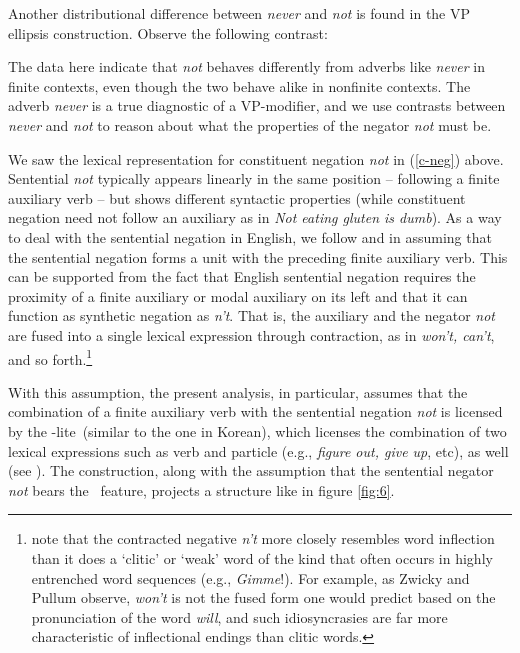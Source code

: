 \documentclass[output=paper]{langsci/langscibook}
\begin{document}
{\begin{exe}
\begin{xlist}
\begin{exe}
\begin{xlist}
Another distributional difference between \emph{never} and \emph{not} is found in
the VP ellipsis construction.  Observe the following
contrast:

\eal
\label{vpe-not-ex}
\zl


%
The data here indicate that \emph{not} behaves differently from
adverbs like \emph{never} in finite contexts, even though the two
behave alike in nonfinite contexts. The adverb \emph{never} is a true
diagnostic of a VP-modifier, and we use contrasts between \emph{never} and \emph{not} to reason about what the properties of
the negator \emph{not} must be.


We saw the lexical representation for constituent negation
\emph{not} in (\ref{c-neg}) above.
 Sentential \emph{not} typically appears linearly in the
same position -- following a finite auxiliary verb -- but shows
different syntactic properties (while
 constituent negation need not follow an auxiliary
 as in \emph{Not eating gluten is dumb}).
 As a way
 to deal with the sentential negation in English,
  we follow \citet{Bresnan:01} and \citet{KM} in assuming that the sentential negation forms a unit with the preceding
finite auxiliary verb.  This can be supported from
the fact that English sentential negation requires the proximity of
a finite auxiliary or modal auxiliary on its left and that it can function as synthetic negation as \emph{n't}. That is, the auxiliary and the negator \emph{not} are fused into a single lexical
expression through contraction, as in \emph{won't, can't},
and so forth.\footnote{\citet{ZP:83} note that the contracted
negative \emph{n't} more closely
resembles word inflection than it does a `clitic' or `weak' word of
the kind that often occurs in highly entrenched word sequences
(e.g., \emph{Gimme}!). For example, as Zwicky and Pullum observe,
\emph{won't} is not the fused form one would predict based on
the pronunciation of the word \emph{will}, and such idiosyncrasies are far more characteristic of inflectional endings than clitic words.}



 With this assumption, the
present analysis, in particular, assumes that
the combination of a finite auxiliary verb with the sentential
negation \emph{not} is licensed by the \hd-lite\ (similar to the one
in Korean), which licenses
the combination of two lexical expressions such as verb and particle (e.g., \emph{figure out, give up}, etc), as well (see \citet{KM}). The construction, along with the assumption that the sentential negator \emph{not}
bears the \LEX\ feature, projects a structure like in figure \ref{fig:6}.


\end{xlist}
\end{exe}
\end{xlist}
\end{exe}}
\end{document}
